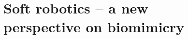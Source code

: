 \documentclass[final,thumbmain]{thesis}  %
\author{Brandon Jonathan Caasenbrood}
\begin{document}



 



\cleardoublepage
{}

\tableofcontents
\newpage

\isstarredchapterfalse
\cleardoublepage
\thispagestyle{empty}
\label{chap: intro}
\setcounter{page}{1}

\chapter[Soft robotics -- a new perspective]{Soft robotics -- a new \\ perspective on biomimicry}
\label{chap: introduction}








\end{document}

